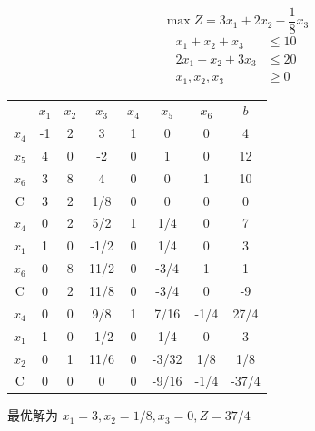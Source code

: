 \documentclass[../../main.tex]{subfiles}
\begin{document}
\begin{problem}
\begin{equation*}
    \max Z = 3x_1+2x_2-\frac{1}{8}x_3
\end{equation*}
\begin{align*}
    x_1+x_2+x_3   & \leq 10 \\
    2x_1+x_2+3x_3 & \leq 20 \\
    x_1,x_2,x_3   & \geq 0
\end{align*}
\end{problem}

\begin{solution}
    \begin{table}[H]
        \centering
        \begin{tabular}{c|ccccccc}
            \hline
                    & \(x_1\) & \(x_2\) & \(x_3\) & \(x_4\) & \(x_5\) & \(x_6\) & \(b\) \\
            \(x_4\) & -1      & 2       & 3       & 1       & 0       & 0       & 4     \\
            \(x_5\) & 4       & 0       & -2      & 0       & 1       & 0       & 12    \\
            \(x_6\) & 3       & 8       & 4       & 0       & 0       & 1       & 10    \\
            C       & 3       & 2       & 1/8     & 0       & 0       & 0       & 0     \\
            \hline
            \(x_4\) & 0       & 2       & 5/2     & 1       & 1/4     & 0       & 7     \\
            \(x_1\) & 1       & 0       & -1/2    & 0       & 1/4     & 0       & 3     \\
            \(x_6\) & 0       & 8       & 11/2    & 0       & -3/4    & 1       & 1     \\
            C       & 0       & 2       & 11/8    & 0       & -3/4    & 0       & -9    \\
            \hline
            \(x_4\) & 0       & 0       & 9/8     & 1       & 7/16    & -1/4    & 27/4  \\
            \(x_1\) & 1       & 0       & -1/2    & 0       & 1/4     & 0       & 3     \\
            \(x_2\) & 0       & 1       & 11/6    & 0       & -3/32   & 1/8     & 1/8   \\
            C       & 0       & 0       & 0       & 0       & -9/16   & -1/4    & -37/4 \\
            \hline
        \end{tabular}
    \end{table}
    最优解为 \(x_1 = 3, x_2 = 1/8, x_3 = 0, Z = 37/4\)
\end{solution}
\end{document}
